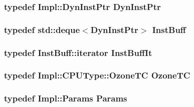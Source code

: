 \label{classFrontEnd_ab741745c86a14c765b999c11167636d9}
\hypertarget{classFrontEnd_a028ce10889c5f6450239d9e9a7347976}{
\subsubsection[{DynInstPtr}]{\setlength{\rightskip}{0pt plus 5cm}typedef Impl::DynInstPtr {\bf DynInstPtr}}}
\label{classFrontEnd_a028ce10889c5f6450239d9e9a7347976}
\hypertarget{classFrontEnd_aa99c789f993c7211a0d79f7b05cf887b}{
\subsubsection[{InstBuff}]{\setlength{\rightskip}{0pt plus 5cm}typedef {\bf std::deque}$<${\bf DynInstPtr}$>$ {\bf InstBuff}}}
\label{classFrontEnd_aa99c789f993c7211a0d79f7b05cf887b}
\hypertarget{classFrontEnd_a44b16657794dcb6775f2ef42b3e37b22}{
\subsubsection[{InstBuffIt}]{\setlength{\rightskip}{0pt plus 5cm}typedef InstBuff::iterator {\bf InstBuffIt}}}
\label{classFrontEnd_a44b16657794dcb6775f2ef42b3e37b22}
\hypertarget{classFrontEnd_a4732af5c8908e169c3e86ef8a5bac05f}{
\subsubsection[{OzoneTC}]{\setlength{\rightskip}{0pt plus 5cm}typedef Impl::CPUType::OzoneTC {\bf OzoneTC}}}
\label{classFrontEnd_a4732af5c8908e169c3e86ef8a5bac05f}
\hypertarget{classFrontEnd_a818e103eae798a24a06a0a34631849ea}{
\subsubsection[{Params}]{\setlength{\rightskip}{0pt plus 5cm}typedef Impl::Params {\bf Params}}}
\label{classFrontEnd_a818e103eae798a24a06a0a34631849ea}


